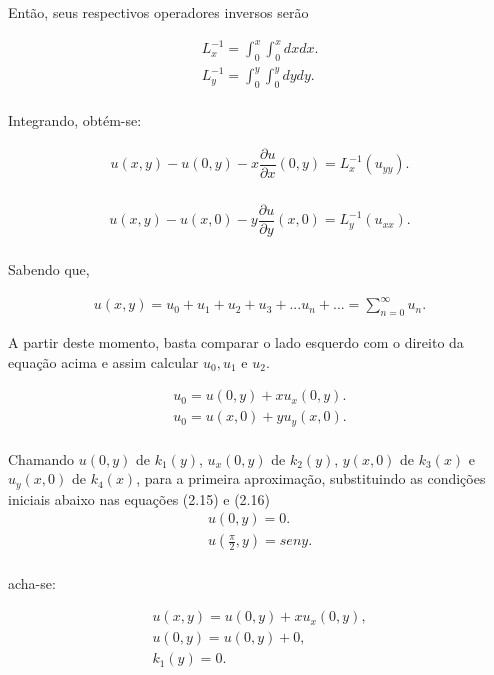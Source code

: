 Então, seus respectivos operadores inversos serão

\begin{gather*}
L_{x}^{-1} = \int_0^x \int_0^x  dxdx.\\
L_{y}^{-1} = \int_0^y \int_0^y  dydy .\\
\end{gather*}

Integrando, obtém-se:

\begin{gather*}
u(x,y) - u(0,y) - x\dfrac{\partial u}{\partial x}(0,y) = L_{x}^{-1}(u_{yy}).\\
\end{gather*}

\begin{gather*}
u(x,y) - u(x,0) - y \dfrac{\partial u}{\partial y}(x,0) = L_{y}^{-1}(u_{xx}) . \\
\end{gather*}

Sabendo que,

\begin{gather}
u(x,y) = u_{0} + u_{1} + u_{2} + u_{3} + ... u_{n} + ... = \sum_{n=0}^{\infty}u_{n}.
\end{gather}

A partir deste momento, basta comparar o lado esquerdo com o direito da equação acima e assim calcular  $u_{0}, u_{1}$  e $u_{2}$.

\begin{gather}
u_{0} = u(0,y) + xu_{x}(0,y).\nonumber\\
u_{0} = u(x,0) + yu_{y}(x,0).\nonumber\\
\end{gather}

Chamando $u(0,y)$ de  $k_{1}(y)$, $u_{x}(0,y)$ de $k_{2}(y)$, $y(x,0)$ de $k_{3}(x)$ e $u_{y}(x,0)$ de $k_{4}(x)$, para a primeira aproximação, substituindo as condições iniciais abaixo nas equações (2.15)  e (2.16)
\begin{gather}
u(0,y) = 0.\nonumber\\
u\left(\frac{\pi}{2},y\right) = seny.\nonumber\\
\end{gather}

acha-se:

\begin{gather}
u(x,y) = u(0,y) + xu_{x}(0,y),\nonumber\\
u(0,y) = u(0,y) + 0,\nonumber\\
k_{1}(y) = 0.\nonumber\\
\end{gather}


